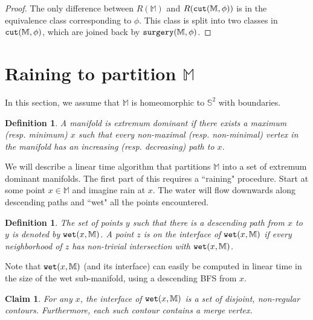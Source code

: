 \documentclass[11pt]{article}
\newtheorem{claim}[theorem]{Claim}
\newtheorem{definition}[theorem]{Definition}
\theoremstyle{definition}
\newcommand{\MM}{\mathbb{M}}
\newcommand{\SSS}{\mathbb{S}}
\newcommand{\cut}{{\tt cut}}
\newcommand{\reeb}{R}
\newcommand{\surgery}{{\tt surgery}}
\newcommand{\wet}{{\tt wet}}
\begin{document}
\begin{proof} The only difference between $\reeb(\MM)$ and $\reeb(\cut(\MM,\phi))$ is in the equivalence
class corresponding to $\phi$. This class is split into two classes in $\cut(\MM,\phi)$, which are joined
back by $\surgery(\MM,\phi)$.
\end{proof}

\section{Raining to partition $\MM$} \label{sec:rain}

In this section, we assume that $\MM$ is homeomorphic to $\SSS^2$ with boundaries. 

\begin{definition} \label{def:dom} A manifold is \emph{extremum dominant} if there exists
a maximum (resp. minimum) $x$ such that every non-maximal (resp. non-minimal) \emph{vertex} in the manifold has an increasing (resp. decreasing) path to $x$.
\end{definition}

We will describe a linear time algorithm that partitions $\MM$ into a set of extremum dominant manifolds.
The first part of this requires a ``raining" procedure. Start at some point $x \in \MM$ and imagine rain at $x$.
The water will flow downwards along descending paths and ``wet" all the points encountered.

\begin{definition} \label{def:wet} The set of points $y$ such that there is a descending path from $x$ to $y$
is denoted by $\wet(x,\MM)$. A point $z$ is on the \emph{interface} of $\wet(x,\MM)$ if every neighborhood of $z$
has non-trivial intersection with $\wet(x,\MM)$.
\end{definition}

Note that $\wet(x,\MM)$ (and its interface) can easily be computed in linear time in the size of the wet sub-manifold, using a descending BFS from $x$.

\begin{claim} \label{clm:inter} For any $x$, the interface of $\wet(x,\MM)$ is a set of disjoint, non-regular contours.
Furthermore, each such contour contains a merge vertex.
\end{claim}
\end{document}
